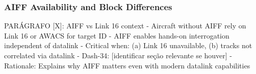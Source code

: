 \documentclass[11pt, a4paper, twoside]{report}
\newcommand{\dashref}[1]{Dash-34~\S~#1}
\begin{document}

\subsubsection{AIFF Availability and Block Differences}
\label{sec:C4-S3-S5-S5}


PARÁGRAFO [X]: AIFF vs Link 16 context
- Aircraft without AIFF rely on Link 16 or AWACS for target ID
- AIFF enables hands-on interrogation independent of datalink
- Critical when: (a) Link 16 unavailable, (b) tracks not correlated via datalink
- Dash-34: [identificar seção relevante se houver]
- Rationale: Explains why AIFF matters even with modern datalink capabilities
\end{document}
